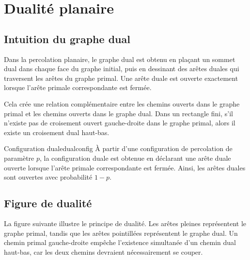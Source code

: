 \documentclass[11pt,a4paper]{report}
\begin{document}
\chapter{Dualité planaire}

\section{Intuition du graphe dual}

Dans la percolation planaire, le graphe dual est obtenu en plaçant un sommet dual dans chaque face du graphe initial, puis en dessinant des arêtes duales qui traversent les arêtes du graphe primal. Une arête duale est ouverte exactement lorsque l'arête primale correspondante est fermée.

Cela crée une relation complémentaire entre les chemins ouverts dans le graphe primal et les chemins ouverts dans le graphe dual. Dans un rectangle fini, s'il n'existe pas de croisement ouvert gauche-droite dans le graphe primal, alors il existe un croisement dual haut-bas.

\begin{definitionbox}{Configuration duale}{dualconfig}
À partir d'une configuration de percolation de paramètre $p$, la configuration duale est obtenue en déclarant une arête duale ouverte lorsque l'arête primale correspondante est fermée. Ainsi, les arêtes duales sont ouvertes avec probabilité $1-p$.
\end{definitionbox}

\section{Figure de dualité}

La figure suivante illustre le principe de dualité. Les arêtes pleines représentent le graphe primal, tandis que les arêtes pointillées représentent le graphe dual. Un chemin primal gauche-droite empêche l'existence simultanée d'un chemin dual haut-bas, car les deux chemins devraient nécessairement se couper.
\end{document}
